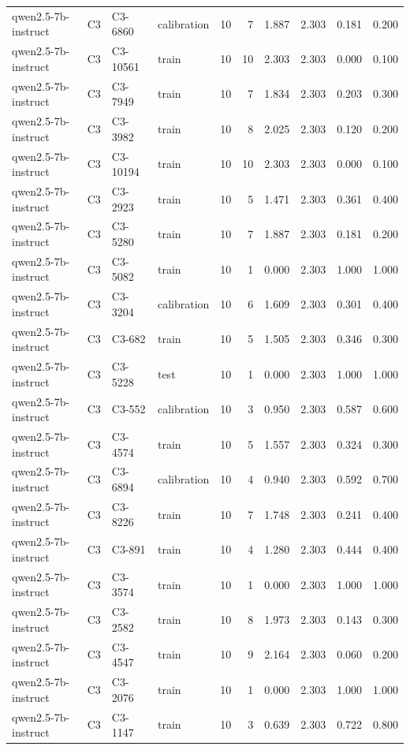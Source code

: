 \begin{table}
\begin{tabular}{llllrrrrrr}
qwen2.5-7b-instruct & C3 & C3-6860 & calibration & 10 & 7 & 1.887 & 2.303 & 0.181 & 0.200 \\
qwen2.5-7b-instruct & C3 & C3-10561 & train & 10 & 10 & 2.303 & 2.303 & 0.000 & 0.100 \\
qwen2.5-7b-instruct & C3 & C3-7949 & train & 10 & 7 & 1.834 & 2.303 & 0.203 & 0.300 \\
qwen2.5-7b-instruct & C3 & C3-3982 & train & 10 & 8 & 2.025 & 2.303 & 0.120 & 0.200 \\
qwen2.5-7b-instruct & C3 & C3-10194 & train & 10 & 10 & 2.303 & 2.303 & 0.000 & 0.100 \\
qwen2.5-7b-instruct & C3 & C3-2923 & train & 10 & 5 & 1.471 & 2.303 & 0.361 & 0.400 \\
qwen2.5-7b-instruct & C3 & C3-5280 & train & 10 & 7 & 1.887 & 2.303 & 0.181 & 0.200 \\
qwen2.5-7b-instruct & C3 & C3-5082 & train & 10 & 1 & 0.000 & 2.303 & 1.000 & 1.000 \\
qwen2.5-7b-instruct & C3 & C3-3204 & calibration & 10 & 6 & 1.609 & 2.303 & 0.301 & 0.400 \\
qwen2.5-7b-instruct & C3 & C3-682 & train & 10 & 5 & 1.505 & 2.303 & 0.346 & 0.300 \\
qwen2.5-7b-instruct & C3 & C3-5228 & test & 10 & 1 & 0.000 & 2.303 & 1.000 & 1.000 \\
qwen2.5-7b-instruct & C3 & C3-552 & calibration & 10 & 3 & 0.950 & 2.303 & 0.587 & 0.600 \\
qwen2.5-7b-instruct & C3 & C3-4574 & train & 10 & 5 & 1.557 & 2.303 & 0.324 & 0.300 \\
qwen2.5-7b-instruct & C3 & C3-6894 & calibration & 10 & 4 & 0.940 & 2.303 & 0.592 & 0.700 \\
qwen2.5-7b-instruct & C3 & C3-8226 & train & 10 & 7 & 1.748 & 2.303 & 0.241 & 0.400 \\
qwen2.5-7b-instruct & C3 & C3-891 & train & 10 & 4 & 1.280 & 2.303 & 0.444 & 0.400 \\
qwen2.5-7b-instruct & C3 & C3-3574 & train & 10 & 1 & 0.000 & 2.303 & 1.000 & 1.000 \\
qwen2.5-7b-instruct & C3 & C3-2582 & train & 10 & 8 & 1.973 & 2.303 & 0.143 & 0.300 \\
qwen2.5-7b-instruct & C3 & C3-4547 & train & 10 & 9 & 2.164 & 2.303 & 0.060 & 0.200 \\
qwen2.5-7b-instruct & C3 & C3-2076 & train & 10 & 1 & 0.000 & 2.303 & 1.000 & 1.000 \\
qwen2.5-7b-instruct & C3 & C3-1147 & train & 10 & 3 & 0.639 & 2.303 & 0.722 & 0.800 \\

\end{tabular}
\end{table}
